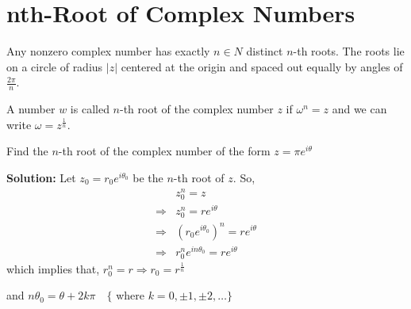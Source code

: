 \section{nth-Root of Complex Numbers}
Any nonzero complex number has exactly $n\in N$ distinct $n$-th roots. The roots lie on a circle of radius $|z|$ centered at the origin and spaced out equally by angles of $\displaystyle\frac{2\pi}{n}$. 
\begin{defn}
    A number $w$ is called $n$-th root of the complex number $z$ if $\displaystyle \omega^n=z$ and we can write $\displaystyle \omega=z^{\frac{1}{n}}$. 
\end{defn}
\begin{ex}
Find the $n$-th root of the complex number of the form $z=\pi e^{i \theta}$

\noindent \textbf{Solution:} Let $z_0=r_0 e^{i \theta_0}$ be the $n$-th root of $z$.
So,
$$
\begin{aligned}
& z_0^n=z \\
\Rightarrow & z_0^n=r e^{i \theta} \\
\Rightarrow & \left(r_0 e^{i \theta_0}\right)^n=r e^{i \theta} \\
\Rightarrow & r_0^n e^{i n \theta_0}=r e^{i \theta}
\end{aligned}
$$
which implies that, $\displaystyle r_0^n=r \Rightarrow r_0=r^{\frac{1}{n}}$ \par \noindent and $\displaystyle n \theta_0=\theta+2 k \pi \quad\{$ where $k=0, \pm 1, \pm 2, \ldots\}$


\end{ex}
